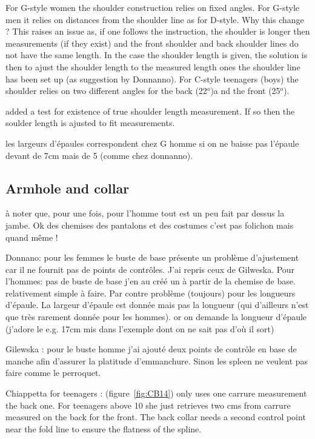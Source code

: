 \documentclass[11pt,a4paper]{report}
\begin{document}
For G-style women the shoulder construction relies on fixed angles. For G-style men it relies on distances from the shoulder line as for D-style. Why  this change ? This raises an issue as, if one follows the instruction, the shoulder is longer then measurements (if they exist) and the front shoulder and back shoulder lines do not have the same length. In the case the shoulder length is given, the solution is then to ajust the shoulder length to the measured length ones the shoulder line has been set up (as suggestion by Donnanno).
For C-style teenagers (boys) the shoulder relies on two different angles for the back (22$^o$)a nd the front (25$^o$).

added a test for existence of true shoulder length measurement. If so then the soulder length is ajusted to fit measurements.

les largeurs d'épaules correspondent chez G homme si on ne baisse pas l'épaule devant de 7cm mais de 5 (comme chez donnanno).

\subsection{Armhole and collar}

à noter que, pour une fois, pour l'homme tout est un peu fait par dessus
la jambe. Ok des chemises des pantalons et des costumes c'est pas
folichon mais quand même !

Donnano:  pour les femmes le buste de base présente un problème d'ajustement car il ne
fournit pas de points de contrôles. J'ai repris ceux de Gilweska.
Pour l'hommes: pas de buste de base j'en au  créé un à partir de la chemise de base.
relativement simple à faire. Par contre problème (toujours) pour les
longueurs d'épaule. La largeur d'épaule est donnée mais pas la
longueur (qui d'ailleurs n'est que très rarement donnée pour les
hommes). or on demande la longueur d'épaule (j'adore le e.g. 17cm mis
dans l'exemple dont on ne sait pas d'où il sort)

Gilewska : pour le buste homme j'ai ajouté  deux points de contrôle
en base de manche  afin d'assurer la platitude d'emmanchure. Sinon les
spleen ne veulent pas faire comme le perroquet.


Chiappetta for teenagers :  (figure~\ref{fig:CB14}) only uses one carrure measurement the back one. For teenagers above 10 she just retrieves two cms from  carrure measured on the back for the front. The back collar needs a second control point near the fold line to ensure the flatness of the spline.
\end{document}
